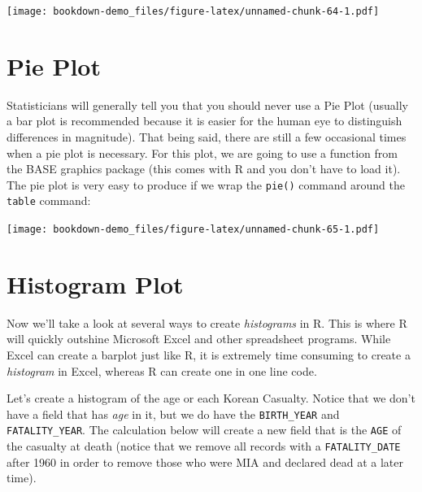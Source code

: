 \documentclass[]{book}
\newenvironment{Shaded}{\begin{snugshade}}{\end{snugshade}}
\newcommand{\KeywordTok}[1]{\textcolor[rgb]{0.13,0.29,0.53}{\textbf{{#1}}}}
\newcommand{\DataTypeTok}[1]{\textcolor[rgb]{0.13,0.29,0.53}{{#1}}}
\newcommand{\StringTok}[1]{\textcolor[rgb]{0.31,0.60,0.02}{{#1}}}
\newcommand{\NormalTok}[1]{{#1}}
\begin{document}
\texttt{[image: bookdown-demo\_files/figure-latex/unnamed-chunk-64-1.pdf]}

\section{Pie Plot}\label{pie-plot}

Statisticians will generally tell you that you should never use a Pie
Plot (usually a bar plot is recommended because it is easier for the
human eye to distinguish differences in magnitude). That being said,
there are still a few occasional times when a pie plot is necessary. For
this plot, we are going to use a function from the BASE graphics package
(this comes with R and you don't have to load it). The pie plot is very
easy to produce if we wrap the \texttt{pie()} command around the
\texttt{table} command:

\begin{Shaded}
\end{Shaded}

\texttt{[image: bookdown-demo\_files/figure-latex/unnamed-chunk-65-1.pdf]}

\section{Histogram Plot}\label{histogram-plot}

Now we'll take a look at several ways to create \emph{histograms} in R.
This is where R will quickly outshine Microsoft Excel and other
spreadsheet programs. While Excel can create a barplot just like R, it
is extremely time consuming to create a \emph{histogram} in Excel,
whereas R can create one in one line code.

Let's create a histogram of the age or each Korean Casualty. Notice that
we don't have a field that has \emph{age} in it, but we do have the
\texttt{BIRTH\_YEAR} and \texttt{FATALITY\_YEAR}. The calculation below
will create a new field that is the \texttt{AGE} of the casualty at
death (notice that we remove all records with a \texttt{FATALITY\_DATE}
after 1960 in order to remove those who were MIA and declared dead at a
later time).
\end{document}
